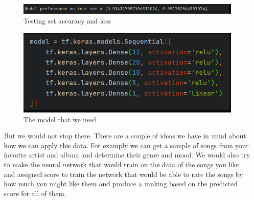 \documentclass[12pt, oneside, a4paper]{article}
\begin{document}
    \FloatBarrier 
    \begin{figure}[H]
        \caption{Testing set accuracy and loss} 
        \centerline{
        \includegraphics[width=\textwidth]{test_set.PNG}
        } 
    \end{figure}
    
    \FloatBarrier 
    \begin{figure}[H]
        \caption{The model that we used} 
        \centerline{
        \includegraphics[width=\textwidth]{model.PNG}
        } 
    \end{figure}

    But we would not stop there. There are a couple of ideas we have in mind about how we can apply this data. For examply we can get a sample of songs from your favorite artist and album and determine their genre and mood. We would also try to make the neural network that would train on the data of the songs you like and assigned score to train the network that would be able to rate the songs by how much you might like them and produce a ranking based on the predicted score for all of them. 
\end{document}
